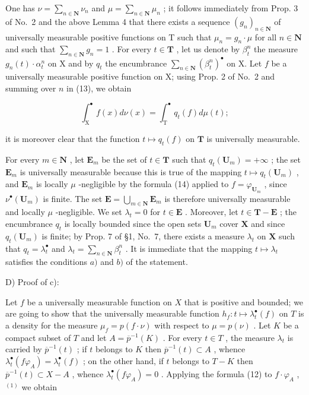 One has \(\nu = \sum_{n\in \mathbf{N}}\nu_n\) and \(\mu = \sum_{n\in \mathbf{N}}\mu_n\) ; it follows immediately from Prop. 3 of No.~2 and the above Lemma 4 that there exists a sequence \((g_n)_{n\in \mathbf{N}}\) of universally measurable positive functions on T such that \(\mu_{n} = g_{n}\cdot \mu\) for all \(n\in \mathbf{N}\) and such that \(\sum_{n\in \mathbf{N}}g_n = 1\) . For every \(t\in \mathbf{T}\) , let us denote by \(\beta_t^n\) the measure \(g_{n}(t)\cdot \alpha_{t}^{n}\) on X and by \(q_{t}\) the encumbrance \(\sum_{n\in \mathbf{N}}(\beta_t^n)^{\bullet}\) on X. Let \(f\) be a universally measurable positive function on X; using Prop. 2 of No.~2 and summing over \(n\) in (13), we obtain

\[
\int_ {\mathrm{X}} ^ {\bullet} f (x) d \nu (x) = \int_ {\mathrm{T}} ^ {\bullet} q _ {t} (f) d \mu (t);\tag{14}
\]

it is moreover clear that the function \(t \mapsto q_t(f)\) on \(\mathbf{T}\) is universally measurable.

For every \(m \in \mathbf{N}\) , let \(\mathbf{E}_m\) be the set of \(t \in \mathbf{T}\) such that \(q_t(\mathbf{U}_m) = +\infty\) ; the set \(\mathbf{E}_m\) is universally measurable because this is true of the mapping \(t \mapsto q_t(\mathbf{U}_m)\) , and \(\mathbf{E}_m\) is locally \(\mu\) -negligible by the formula (14) applied to \(f = \varphi_{\mathbf{U}_m}\) , since \(\nu^\bullet(\mathbf{U}_m)\) is finite. The set \(\mathbf{E} = \bigcup_{m \in \mathbf{N}} \mathbf{E}_m\) is therefore universally measurable and locally \(\mu\) -negligible. We set \(\lambda_t = 0\) for \(t \in \mathbf{E}\) . Moreover, let \(t \in \mathbf{T} - \mathbf{E}\) ; the encumbrance \(q_t\) is locally bounded since the open sets \(\mathbf{U}_m\) cover \(\mathbf{X}\) and since \(q_t(\mathbf{U}_m)\) is finite; by Prop. 7 of §1, No.~7, there exists a measure \(\lambda_t\) on \(\mathbf{X}\) such that \(q_t = \lambda_t^\bullet\) and \(\lambda_t = \sum_{n \in \mathbf{N}} \beta_t^n\) . It is immediate that the mapping \(t \mapsto \lambda_t\) satisfies the conditions \(a)\) and \(b)\) of the statement.

D) Proof of c):

Let \(f\) be a universally measurable function on \(X\) that is positive and bounded; we are going to show that the universally measurable function \(h_f: t \mapsto \lambda_t^\bullet(f)\) on \(T\) is a density for the measure \(\mu_f = p(f \cdot \nu)\) with respect to \(\mu = p(\nu)\) . Let \(K\) be a compact subset of \(T\) and let \(A = \overline{p}^{-1}(K)\) . For every \(t \in T\) , the measure \(\lambda_t\) is carried by \(\overline{p}^{-1}(t)\) ; if \(t\) belongs to \(K\) then \(\overline{p}^{-1}(t) \subset A\) , whence \(\lambda_t^\bullet(f\varphi_A) = \lambda_t^\bullet(f)\) ; on the other hand, if \(t\) belongs to \(T - K\) then \(\overline{p}^{-1}(t) \subset X - A\) , whence \(\lambda_t^\bullet(f\varphi_A) = 0\) . Applying the formula (12) to \(f \cdot \varphi_A\) , \(^{(1)}\) we obtain


